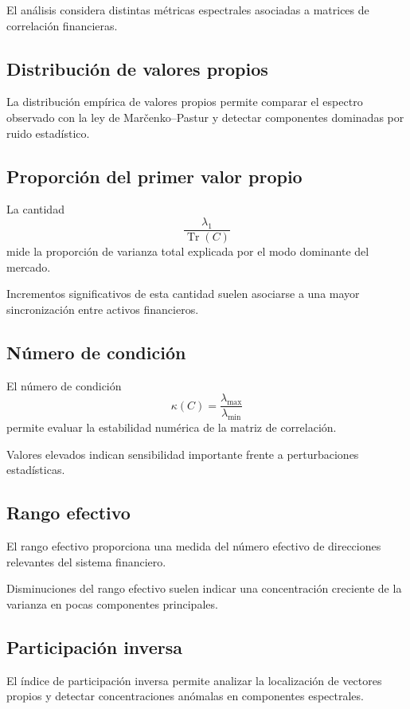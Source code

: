 \documentclass[letterpaper,12pt,oneside]{book}
\begin{document}
El análisis considera distintas métricas espectrales asociadas a matrices de correlación financieras.

\subsection{Distribución de valores propios}

La distribución empírica de valores propios permite comparar el espectro observado con la ley de Marčenko--Pastur y detectar componentes dominadas por ruido estadístico.

\subsection{Proporción del primer valor propio}

La cantidad
\[
\frac{\lambda_1}{\operatorname{Tr}(C)}
\]
mide la proporción de varianza total explicada por el modo dominante del mercado.

Incrementos significativos de esta cantidad suelen asociarse a una mayor sincronización entre activos financieros.

\subsection{Número de condición}

El número de condición
\[
\kappa(C)
=
\frac{\lambda_{\max}}{\lambda_{\min}}
\]
permite evaluar la estabilidad numérica de la matriz de correlación.

Valores elevados indican sensibilidad importante frente a perturbaciones estadísticas.

\subsection{Rango efectivo}

El rango efectivo proporciona una medida del número efectivo de direcciones relevantes del sistema financiero.

Disminuciones del rango efectivo suelen indicar una concentración creciente de la varianza en pocas componentes principales.

\subsection{Participación inversa}

El índice de participación inversa permite analizar la localización de vectores propios y detectar concentraciones anómalas en componentes espectrales.
\end{document}
